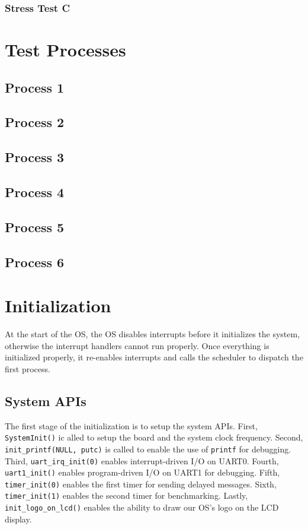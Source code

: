 \documentclass[se]{uw-wkrpt}
\begin{document}
\subsubsection{Stress Test C}

\section{Test Processes}\label{sec:testproc}

\subsection{Process 1}

\subsection{Process 2}

\subsection{Process 3}

\subsection{Process 4}

\subsection{Process 5}

\subsection{Process 6}

\section{Initialization}\label{sec:init}

At the start of the OS, the OS disables interrupts before it initializes the system, otherwise the interrupt handlers cannot run properly. Once everything is initialized properly, it re-enables interrupts and calls the scheduler to dispatch the first process.

\subsection{System APIs}
The first stage of the initialization is to setup the system APIs. First, \texttt{SystemInit()} ic alled to setup the board and the system clock frequency. Second, \texttt{init\_printf(NULL, putc)} is called to enable the use of \texttt{printf} for debugging. Third, \texttt{uart\_irq\_init(0)} enables interrupt-driven I/O on UART0. Fourth, \texttt{uart1\_init()} enables program-driven I/O on UART1 for debugging. Fifth, \texttt{timer\_init(0)} enables the first timer for sending delayed messages. Sixth,  \texttt{timer\_init(1)} enables the second timer for benchmarking. Lastly, \texttt{init\_logo\_on\_lcd()} enables the ability to draw our OS's logo on the LCD display.
\end{document}
